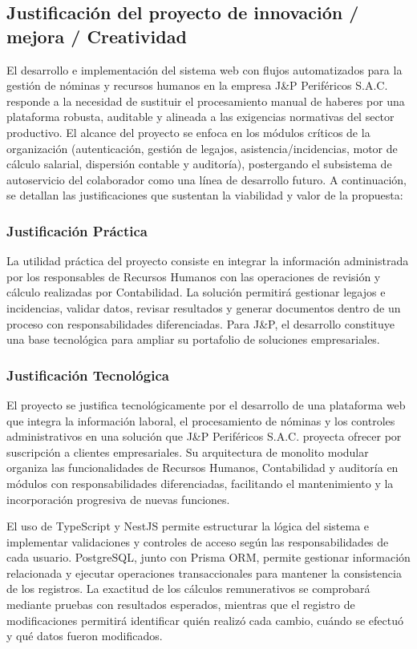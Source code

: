 \subsection{Justificación del proyecto de innovación / mejora / Creatividad}

El desarrollo e implementación del sistema web con flujos automatizados para la gestión de nóminas y recursos humanos en la empresa J\&P Periféricos S.A.C. 
responde a la necesidad de sustituir el procesamiento manual de haberes por una plataforma robusta, auditable y alineada a las exigencias normativas del sector productivo. 
El alcance del proyecto se enfoca en los módulos críticos de la organización (autenticación, gestión de legajos, asistencia/incidencias, motor de cálculo salarial, dispersión contable y auditoría), 
postergando el subsistema de autoservicio del colaborador como una línea de desarrollo futuro. A continuación, se detallan las justificaciones que sustentan la viabilidad y valor de la propuesta:

\subsubsection{Justificación Práctica}
La utilidad práctica del proyecto consiste en integrar la información administrada por los responsables de Recursos Humanos con las operaciones de revisión y cálculo realizadas por Contabilidad. 
La solución permitirá gestionar legajos e incidencias, validar datos, revisar resultados y generar documentos dentro de un proceso con responsabilidades diferenciadas. 
Para J\&P, el desarrollo constituye una base tecnológica para ampliar su portafolio de soluciones empresariales.

\subsubsection{Justificación Tecnológica}
El proyecto se justifica tecnológicamente por el desarrollo de una plataforma web que integra la información laboral, 
el procesamiento de nóminas y los controles administrativos en una solución que J\&P Periféricos S.A.C. proyecta ofrecer por suscripción a clientes empresariales. 
Su arquitectura de monolito modular organiza las funcionalidades de Recursos Humanos, Contabilidad y auditoría en módulos con responsabilidades diferenciadas, 
facilitando el mantenimiento y la incorporación progresiva de nuevas funciones.

El uso de TypeScript y NestJS permite estructurar la lógica del sistema e implementar validaciones y controles de acceso según las responsabilidades de cada usuario. PostgreSQL, junto con
Prisma ORM, permite gestionar información relacionada y ejecutar operaciones transaccionales para mantener la consistencia de los registros. La exactitud de los cálculos remunerativos se comprobará
mediante pruebas con resultados esperados, mientras que el registro de modificaciones permitirá identificar quién realizó cada cambio, cuándo se efectuó y qué datos fueron modificados.

